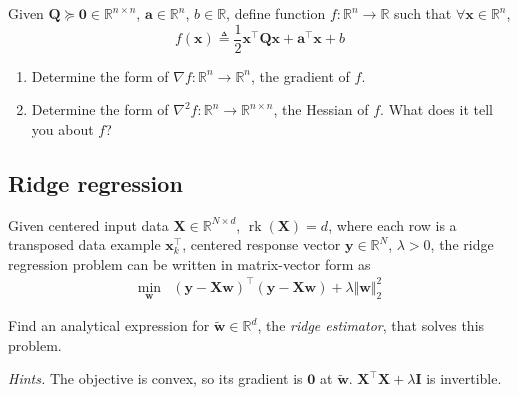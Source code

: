 \documentclass{article}
\numberwithin{equation}{section}
\begin{document}
Given $ \mathbf{Q} \succeq \mathbf{0} \in \mathbb{R}^{n \times n} $,
$ \mathbf{a} \in \mathbb{R}^n $, $ b \in \mathbb{R} $, define function
$ f : \mathbb{R}^n \rightarrow \mathbb{R} $ such that $ \forall \mathbf{x} \in
\mathbb{R}^n $,
\begin{equation*}
    f(\mathbf{x}) \triangleq \frac{1}{2}\mathbf{x}^\top\mathbf{Qx} +
    \mathbf{a}^\top\mathbf{x} + b
\end{equation*}

\begin{enumerate}[label = \alph*.]
    \item
    Determine the form of $ \nabla f : \mathbb{R}^n \rightarrow
    \mathbb{R}^n $, the gradient of $ f $.

    \item
    Determine the form of $ \nabla^2f : \mathbb{R}^n \rightarrow
    \mathbb{R}^{n \times n} $, the Hessian of $ f $. What does it tell you
    about $ f $?
\end{enumerate}

\subsection{Ridge regression}

Given centered input data $ \mathbf{X} \in \mathbb{R}^{N \times d} $,
$ \operatorname{rk}(\mathbf{X}) = d $, where each row is a transposed data
example $ \mathbf{x}_k^\top $, centered response vector
$ \mathbf{y} \in \mathbb{R}^N $, $ \lambda > 0 $, the ridge regression problem
can be written in matrix-vector form as
\begin{equation*}
    \begin{array}{ll}
        \displaystyle\min_\mathbf{w} &
        (\mathbf{y} - \mathbf{Xw})^\top(\mathbf{y} - \mathbf{Xw}) +
        \lambda\Vert\mathbf{w}\Vert_2^2
    \end{array}
\end{equation*}

Find an analytical expression for $ \tilde{\mathbf{w}} \in \mathbb{R}^d $, the
\textit{ridge estimator}, that solves this problem.

\medskip

\textit{Hints.} The objective is convex, so its gradient is $ \mathbf{0} $ at
$ \tilde{\mathbf{w}} $. $ \mathbf{X}^\top\mathbf{X} + \lambda\mathbf{I} $ is
invertible.



\end{document}
